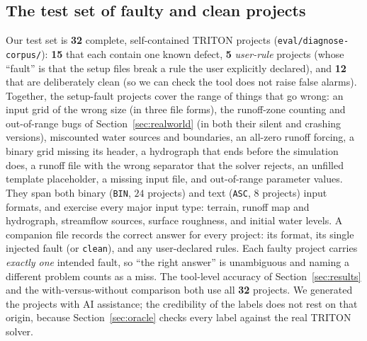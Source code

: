 \documentclass[conference]{IEEEtran}
\begin{document}
\subsection{The test set of faulty and clean projects}
Our test set is \textbf{32} complete, self-contained TRITON projects
(\texttt{eval/diagnose-corpus/}): \textbf{15} that each contain one known defect, \textbf{5}
\emph{user-rule} projects (whose ``fault'' is that the setup files break a rule the user
explicitly declared), and \textbf{12} that are
deliberately clean (so we can check the tool does not raise false alarms). Together, the
setup-fault projects cover the range of things that go wrong: an input grid of the wrong size
(in three file forms), the runoff-zone counting and out-of-range bugs of
Section~\ref{sec:realworld} (in both their silent and crashing versions), miscounted water sources
and boundaries, an all-zero runoff forcing, a binary grid missing its header, a hydrograph that
ends before the simulation does, a runoff file with the wrong separator that the solver rejects,
an unfilled template placeholder, a missing input file, and out-of-range parameter values. They span both binary (\texttt{BIN}, $24$ projects) and text
(\texttt{ASC}, $8$ projects) input formats, and exercise every major input type:
terrain, runoff map and hydrograph, streamflow sources, surface roughness, and initial
water levels. A companion file
records the correct answer for every project: its format, its single injected fault (or
\texttt{clean}), and any user-declared rules. Each faulty project carries \emph{exactly one}
intended fault, so ``the right answer'' is unambiguous and naming a different problem counts as a
miss. The tool-level accuracy of Section~\ref{sec:results} and the with-versus-without comparison
both use all \textbf{32} projects. We generated the projects with AI assistance; the credibility
of the labels does not rest on that origin, because Section~\ref{sec:oracle} checks every label
against the real TRITON solver.
\end{document}
